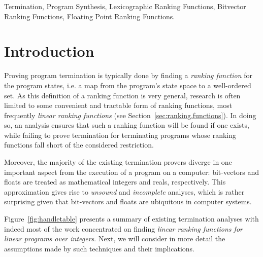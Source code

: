 \documentclass[preprint]{sigplanconf}
\theoremstyle{definition}
\begin{document}
\keywords
Termination, Program Synthesis, Lexicographic Ranking Functions, Bitvector Ranking Functions,
Floating Point Ranking Functions.

\section{Introduction}

Proving program termination is typically done by finding a \emph{ranking function}
for the program states, i.e. a map from the program's state space to a well-ordered set.
As this definition of a ranking function is very general, research is often limited to some
convenient and tractable form of ranking functions, most frequently \emph{linear ranking functions} (see Section~\ref{sec:ranking.functions}). 
In doing so, an analysis ensures that such a ranking function will be found if one  exists, 
while failing to prove termination for terminating programs whose ranking functions fall short of the considered restriction. 

Moreover, the majority of the existing termination provers diverge 
in one important aspect from the execution of a program on a computer:
bit-vectors and floats 
are treated as mathematical integers and reals, respectively.
This approximation gives rise to 
{\em unsound} and {\em incomplete} analyses, which is rather surprising given that bit-vectors and floats are ubiquitous in computer systems. 

Figure~\ref{fig:handletable} presents a summary of existing termination analyses with indeed
most of the work concentrated on finding \emph{linear ranking functions for linear programs over integers}.
Next, we will consider in more detail the assumptions made by such techniques and their implications.\\
\end{document}

